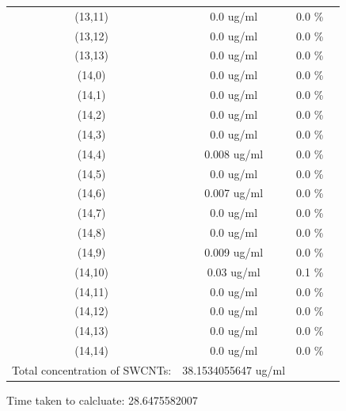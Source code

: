 \documentclass{article}
\begin{document}
\begin{tabular}{c c c c}
(13,11)&        0.0 ug/ml        &0.0 \%\\
(13,12)&        0.0 ug/ml        &0.0 \%\\
(13,13)&        0.0 ug/ml        &0.0 \%\\
(14,0)&        0.0 ug/ml        &0.0 \%\\
(14,1)&        0.0 ug/ml        &0.0 \%\\
(14,2)&        0.0 ug/ml        &0.0 \%\\
(14,3)&        0.0 ug/ml        &0.0 \%\\
(14,4)&        0.008 ug/ml        &0.0 \%\\
(14,5)&        0.0 ug/ml        &0.0 \%\\
(14,6)&        0.007 ug/ml        &0.0 \%\\
(14,7)&        0.0 ug/ml        &0.0 \%\\
(14,8)&        0.0 ug/ml        &0.0 \%\\
(14,9)&        0.009 ug/ml        &0.0 \%\\
(14,10)&        0.03 ug/ml        &0.1 \%\\
(14,11)&        0.0 ug/ml        &0.0 \%\\
(14,12)&        0.0 ug/ml        &0.0 \%\\
(14,13)&        0.0 ug/ml        &0.0 \%\\
(14,14)&        0.0 ug/ml        &0.0 \%\\
Total concentration of SWCNTs: &38.1534055647 ug/ml\\

\end{tabular}Time taken to calcluate: 28.6475582007
\end{document}
